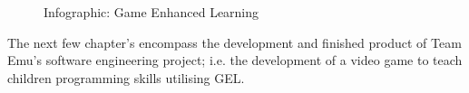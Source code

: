 \begin{figure}[h]
    \caption{Infographic: Game Enhanced Learning}
    \label{fig:my_label}    
\end{figure}
The next few chapter's encompass the development and finished product of Team Emu's software engineering project; i.e. the development of a video game to teach children programming skills utilising GEL.

